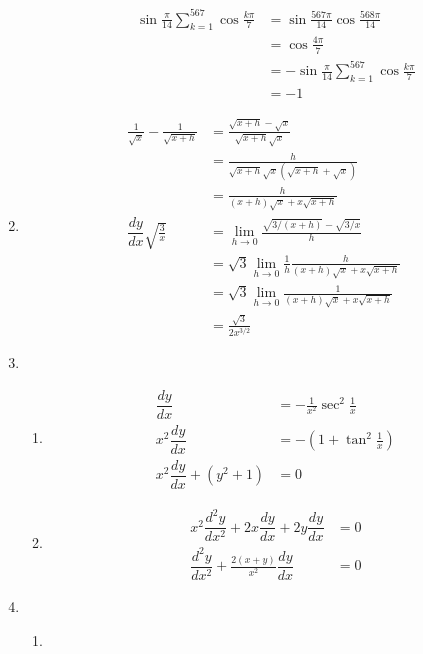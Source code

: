 \documentclass[12pt]{article}
\begin{document}
\begin{enumerate}
\begin{enumerate}
\begin{align*}
                \sin{\frac{\pi}{14}}\sum_{k=1}^{567}\cos{\frac{k\pi}{7}}&=\sin{\frac{567\pi}{14}}\cos{\frac{568\pi}{14}}\\
                &=\cos{\frac{4\pi}{7}}\\&=-\sin{\frac{\pi}{14}}
                \sum_{k=1}^{567}\cos{\frac{k\pi}{7}}\\
                &=-1
            \end{align*}
        \end{enumerate}
        \item \begin{align*}
            \frac{1}{\sqrt{x}}-\frac{1}{\sqrt{x+h}}&=\frac{\sqrt{x+h}-\sqrt{x}}{\sqrt{x+h}\sqrt{x}}\\
            &=\frac{h}{\sqrt{x+h}\sqrt{x}(\sqrt{x+h}+\sqrt{x})}\\
            &=\frac{h}{(x+h)\sqrt{x}+x\sqrt{x+h}}\\
            \dfrac{dy}{dx}\sqrt{\frac{3}{x}}&=\lim_{h\to 0}\frac{\sqrt{3/(x+h)}-\sqrt{3/x}}{h}\\
            &=\sqrt{3}\lim_{h\to 0}\frac{1}{h}\frac{h}{(x+h)\sqrt{x}+x\sqrt{x+h}}\\
            &=\sqrt{3}\lim_{h\to 0}\frac{1}{(x+h)\sqrt{x}+x\sqrt{x+h}}\\
            &=\frac{\sqrt{3}}{2x^{3/2}}
        \end{align*}
        \item \begin{enumerate}
            \item \begin{align*}
                \dfrac{dy}{dx}&=-\frac{1}{x^2}\sec^2{\frac{1}{x}}\\
                x^2\dfrac{dy}{dx}&=-(1+\tan^2{\frac{1}{x}})\\
                x^2\dfrac{dy}{dx}+(y^2+1)&=0
            \end{align*}
            \item \begin{align*}
                x^2\dfrac{d^2y}{dx^2}+2x\dfrac{dy}{dx}+2y\dfrac{dy}{dx}&=0\\
                \dfrac{d^2y}{dx^2}+\frac{2(x+y)}{x^2}\dfrac{dy}{dx}&=0
            \end{align*}
        \end{enumerate}
        \item \begin{enumerate}
            \item \begin{align*}

\end{align*}
\end{enumerate}
\end{enumerate}
\end{document}
